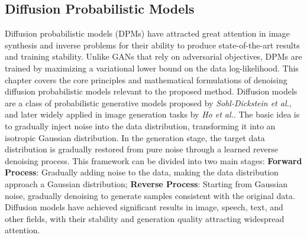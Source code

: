 \documentclass[
reprint,
superscriptaddress,
nofootinbib,
amsmath,amssymb,
aps,
prd,
]{revtex4-2}
\begin{document}
\subsection{Diffusion Probabilistic Models}
Diffusion probabilistic models (DPMs) have attracted great attention in image synthesis and inverse problems for their ability to produce state-of-the-art results and training stability. Unlike GANs that rely on adversarial objectives, DPMs are trained by maximizing a variational lower bound on the data log-likelihood. This chapter covers the core principles and mathematical formulations of denoising diffusion probabilistic models relevant to the proposed method.
Diffusion models are a class of probabilistic generative models proposed by \textit{Sohl-Dickstein et al.}\cite{pmlr-v37-sohl-dickstein15}, and later widely applied in image generation tasks by \textit{Ho et al.}\cite{ho2020denoisingdiffusionprobabilisticmodels}. The basic idea is to gradually inject noise into the data distribution, transforming it into an isotropic Gaussian distribution. In the generation stage, the target data distribution is gradually restored from pure noise through a learned reverse denoising process. This framework can be divided into two main stages:
\textbf{Forward Process}: Gradually adding noise to the data, making the data distribution approach a Gaussian distribution;
\textbf{Reverse Process}: Starting from Gaussian noise, gradually denoising to generate samples consistent with the original data.
Diffusion models have achieved significant results in image, speech, text, and other fields, with their stability and generation quality attracting widespread attention.
\end{document}
